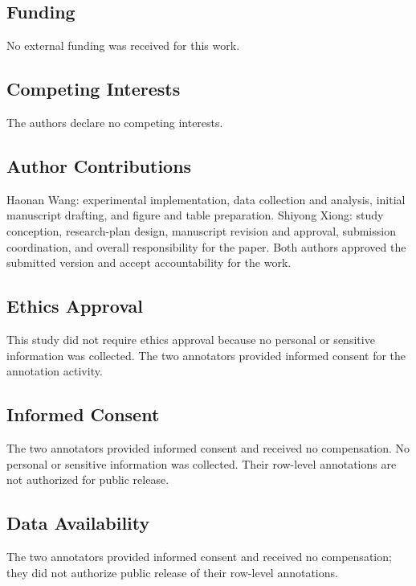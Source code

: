 \documentclass[pdflatex,sn-basic]{sn-jnl}
\begin{document}
\subsection*{Funding}

No external funding was received for this work.

\subsection*{Competing Interests}

The authors declare no competing interests.

\subsection*{Author Contributions}

Haonan Wang: experimental implementation, data collection and analysis, initial manuscript drafting, and figure and table preparation. Shiyong Xiong: study conception, research-plan design, manuscript revision and approval, submission coordination, and overall responsibility for the paper. Both authors approved the submitted version and accept accountability for the work.

\subsection*{Ethics Approval}

This study did not require ethics approval because no personal or sensitive information was collected. The two annotators provided informed consent for the annotation activity.

\subsection*{Informed Consent}

The two annotators provided informed consent and received no compensation. No personal or sensitive information was collected. Their row-level annotations are not authorized for public release.

\subsection*{Data Availability}

The two annotators provided informed consent and received no compensation; they did not authorize public release of their row-level annotations.
\end{document}
